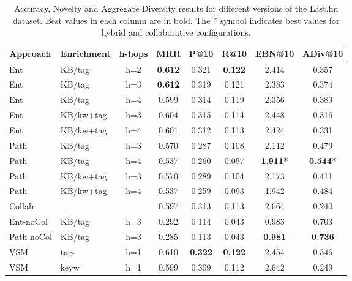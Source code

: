 \begin{table}
\scriptsize
	\label{tbl:graph-rec:Res_sf}
	\begin{tabular}{l l c c c c c c }
		\toprule
		\textbf{Approach} & \textbf{Enrichment} & \textbf{h-hops} &  \textbf{MRR} &  \textbf{P@10} & \textbf{R@10} & \textbf{EBN@10}  & \textbf{ADiv@10}\\
		\midrule
		Ent & KB/tag & h=2 & \textbf{0.612} & 0.321 & \textbf{0.122} & 2.414 & 0.357 \\
		Ent & KB/tag & h=3 & \textbf{0.612} & 0.319 & 0.121 & 2.383 & 0.374 \\
		Ent & KB/tag & h=4 & 0.599 & 0.314 & 0.119 & 2.356 & 0.389 \\
		Ent & KB/kw+tag & h=3 & 0.604 & 0.315 & 0.114 & 2.448 & 0.316 \\
		Ent & KB/kw+tag & h=4 & 0.601 & 0.312 & 0.113 & 2.424 & 0.331 \\
		Path & KB/tag & h=3 & 0.570 & 0.287 & 0.108 & 2.112 & 0.479 \\
		Path & KB/tag & h=4 & 0.537 & 0.260 & 0.097 & \textbf{1.911*} & \textbf{0.544*} \\
		Path & KB/kw+tag & h=3 & 0.570 & 0.289 & 0.104 & 2.173 & 0.411 \\
		Path & KB/kw+tag & h=4 & 0.537 & 0.259 & 0.093 & 1.942 & 0.484 \\
		\midrule
		Collab & & & 0.597 & 0.313 & 0.113 & 2.664 & 0.240 \\	
		Ent-noCol & KB/tag & h=3 & 0.292 & 0.114 & 0.043 & 0.983 & 0.703 \\
		Path-noCol & KB/tag & h=3 &0.285  & 0.113 & 0.043 & \textbf{0.981} & \textbf{0.736} \\
		VSM & tags & h=1 & 0.610 & \textbf{0.322} & \textbf{0.122} & 2.454 & 0.346 \\
		VSM & keyw & h=1 & 0.599 & 0.309 & 0.112 & 2.642 & 0.249 \\
		\bottomrule		
	\end{tabular}
	\caption[Accuracy, Novelty and Aggregate Diversity results for different versions of the Last.fm dataset.]{Accuracy, Novelty and Aggregate Diversity results for different versions of the Last.fm dataset. Best values in each column are in bold. The * symbol indicates best values for hybrid and collaborative configurations. 
	}
\end{table}

